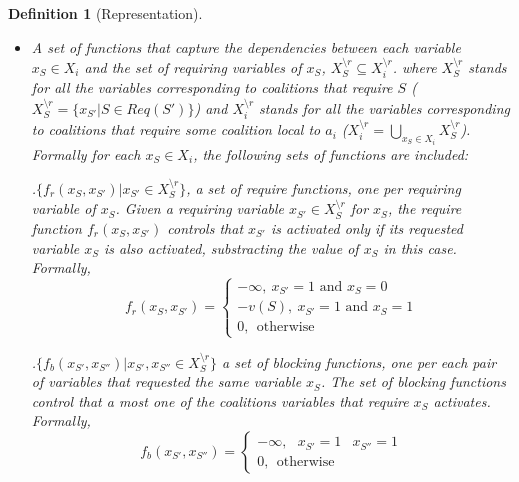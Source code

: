 \documentclass{aamas2012}
\newtheorem{definition}{Definition}
\begin{document}
\begin{definition}[Representation]
\begin{itemize}
	 	
\item A set of functions that capture the dependencies between each variable
$x_S\in X_i$ and the set of \emph{requiring} variables of $x_S$, $X^{\setminus
r}_S\subseteq X^{\setminus r}_i$. where $X^{\setminus r}_S$ stands for all the
variables corresponding to coalitions that require $S$ ($X^{\setminus r}_S = \{x_{S'}\vert S\in
Req(S')\}$) and $X^{\setminus r}_i$ stands for all the variables corresponding
to coalitions that require some coalition local to $a_i$ ($X^{\setminus
r}_i=\bigcup_{x_S\in X_i} X^{\setminus r}_S$). Formally for each $x_S\in X_i$,
the following sets of functions are included:
		
\noindent\Large.\normalsize   $\{f_r(x_S,x_{S'}) \vert x_{S'}\in X^{\setminus
r}_S \}$, a set of \emph{require functions}, one per requiring variable of
$x_S$. Given a requiring variable $x_{S'}\in X^{\setminus r}_S$ for $x_S$, the
\emph{require} function $f_r(x_S,x_{S'})$ controls that $x_{S'}$ is activated only if
its requested variable $x_{S}$ is also activated, substracting the value of
$x_{S}$ in this case. Formally,
		\begin{equation}
		f_r(x_{S},x_{S'})=
		\begin{cases}
		-\infty,  \   x_{S'} = 1 \mbox{ and } x_{S} = 0 \\
		-v(S),  \   x_{S'} = 1 \mbox{ and } x_{S} = 1 \\
		0,  \ \ \mbox{otherwise}
		\end{cases}
		\end{equation}
		
		
\noindent\Large.\normalsize   $\{f_b(x_{S'},x_{S''})\vert x_{S'},x_{S''}\in
X^{\setminus r}_S\}$ a set of \emph{blocking} functions, one per each pair of
variables that requested the same variable $x_S$. The
set of \emph{blocking} functions control that a most one of the coalitions variables
that require $x_S$ activates. Formally,
		 \begin{equation}
		 f_b(x_{S'},x_{S''})= 
		 \begin{cases} 
		 -\infty,  \ \ \  x_{S'} = 1 & x_{S''} = 1 \\  
		 0,  \ \ \mbox{otherwise}
		 \end{cases}
		 \end{equation}
	\end{itemize}
\end{definition}
\end{document}
